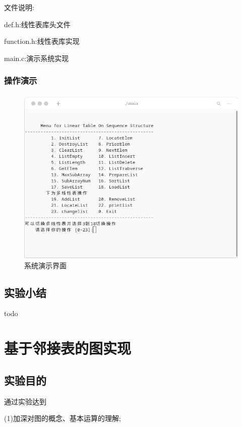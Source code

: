 \documentclass[supercite]{Experimental_Report}
\theoremstyle{definition}
\begin{document}
文件说明:

def.h:线性表库头文件

function.h:线性表库实现

main.c:演示系统实现

\subsubsection{操作演示}

\begin{figure}[htb]
	\begin{center}
		\includegraphics[scale=0.60]{images/1-1.png}
		\caption{系统演示界面}
		\label{fig1-1}
		\end{center}
\end{figure}


\subsection{实验小结}

todo

\newpage

\section{基于邻接表的图实现}

\subsection{实验目的}

通过实验达到

(1)加深对图的概念、基本运算的理解;
\end{document}
